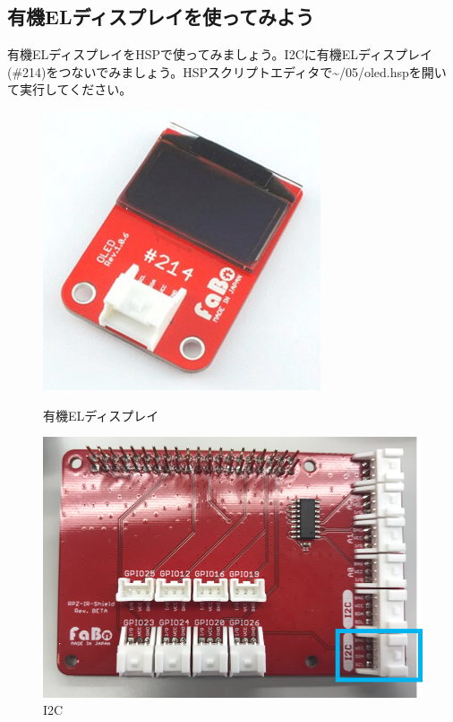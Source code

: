 \subsection{有機ELディスプレイを使ってみよう}
有機ELディスプレイをHSPで使ってみましょう。I2Cに有機ELディスプレイ(\#214)をつないでみましょう。HSPスクリプトエディタで\textasciitilde /05/oled.hspを開いて実行してください。
\begin{figure}[H]
  \begin{minipage}[t]{0.3\columnwidth}
    \centering
 \includegraphics[width=\linewidth]{images/chap05/text05-img032.png}
    \caption{有機ELディスプレイ}
  \end{minipage}
  \begin{minipage}[t]{0.5\columnwidth}
    \centering
    \includegraphics[width=\linewidth]{images/chap05/text05-img033.png}
    \caption{I2C}
  \end{minipage}
\end{figure}

